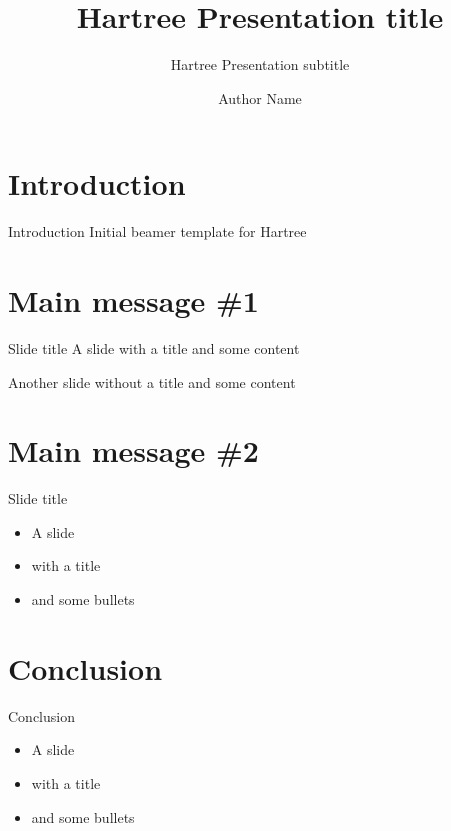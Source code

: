 \documentclass{beamer}
\author{Author Name}
\title{Hartree Presentation title}
\subtitle{Hartree Presentation subtitle}
\begin{document}
\frontcover

\frame{\titlepage}

\frame{\tableofcontents}

\section{Introduction}

\begin{frame}{Introduction}
	Initial beamer template for Hartree
\end{frame}

\section{Main message \#1}
\frame{\sectionpage}

\begin{frame}{Slide title}
A slide with a title and some content
\end{frame}

\begin{frame}
Another slide without a title and some content
\end{frame}

\section{Main message \#2}
\frame{\sectionpage}

\begin{frame}{Slide title}
	\begin{itemize}
		\item A slide
		\item with a title
		\item and some bullets
	\end{itemize}
\end{frame}

\section{Conclusion}

\begin{frame}{Conclusion}
	\begin{itemize}
		\item A slide
		\item with a title
		\item and some bullets
	\end{itemize}
\end{frame}

\backcover
\end{document}
